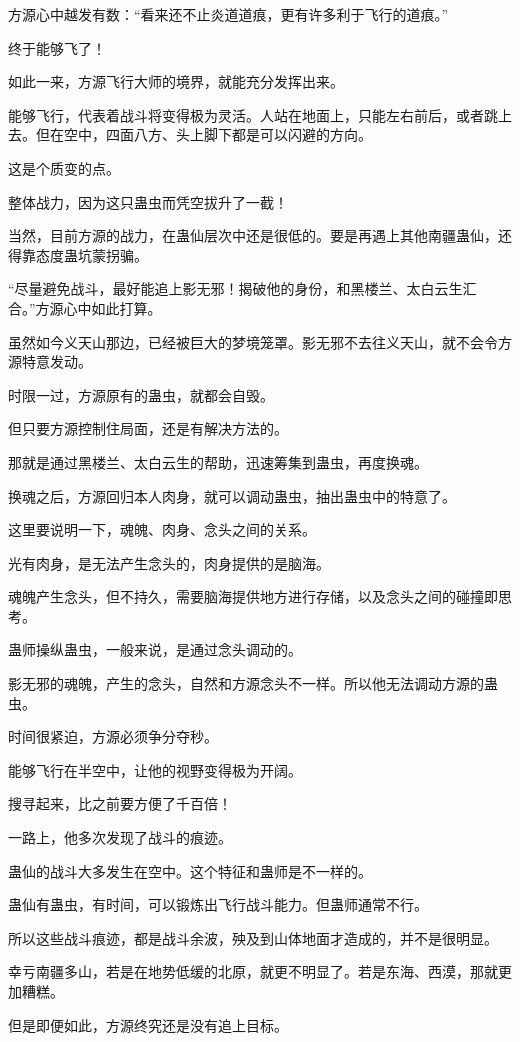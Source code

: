\begin{this_body}
方源心中越发有数：“看来还不止炎道道痕，更有许多利于飞行的道痕。”

终于能够飞了！

如此一来，方源飞行大师的境界，就能充分发挥出来。

能够飞行，代表着战斗将变得极为灵活。人站在地面上，只能左右前后，或者跳上去。但在空中，四面八方、头上脚下都是可以闪避的方向。

这是个质变的点。

整体战力，因为这只蛊虫而凭空拔升了一截！

当然，目前方源的战力，在蛊仙层次中还是很低的。要是再遇上其他南疆蛊仙，还得靠态度蛊坑蒙拐骗。

“尽量避免战斗，最好能追上影无邪！揭破他的身份，和黑楼兰、太白云生汇合。”方源心中如此打算。

虽然如今义天山那边，已经被巨大的梦境笼罩。影无邪不去往义天山，就不会令方源特意发动。

时限一过，方源原有的蛊虫，就都会自毁。

但只要方源控制住局面，还是有解决方法的。

那就是通过黑楼兰、太白云生的帮助，迅速筹集到蛊虫，再度换魂。

换魂之后，方源回归本人肉身，就可以调动蛊虫，抽出蛊虫中的特意了。

这里要说明一下，魂魄、肉身、念头之间的关系。

光有肉身，是无法产生念头的，肉身提供的是脑海。

魂魄产生念头，但不持久，需要脑海提供地方进行存储，以及念头之间的碰撞即思考。

蛊师操纵蛊虫，一般来说，是通过念头调动的。

影无邪的魂魄，产生的念头，自然和方源念头不一样。所以他无法调动方源的蛊虫。

时间很紧迫，方源必须争分夺秒。

能够飞行在半空中，让他的视野变得极为开阔。

搜寻起来，比之前要方便了千百倍！

一路上，他多次发现了战斗的痕迹。

蛊仙的战斗大多发生在空中。这个特征和蛊师是不一样的。

蛊仙有蛊虫，有时间，可以锻炼出飞行战斗能力。但蛊师通常不行。

所以这些战斗痕迹，都是战斗余波，殃及到山体地面才造成的，并不是很明显。

幸亏南疆多山，若是在地势低缓的北原，就更不明显了。若是东海、西漠，那就更加糟糕。

但是即便如此，方源终究还是没有追上目标。


\end{this_body}
